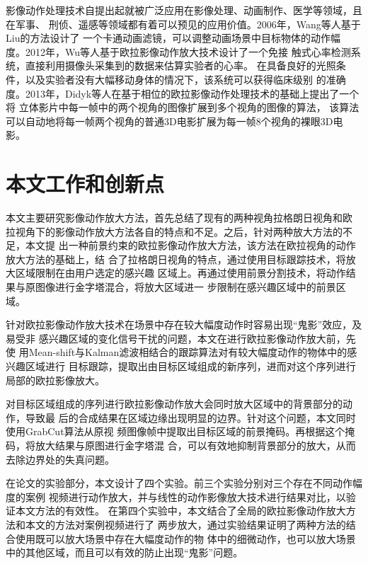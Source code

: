 影像动作处理技术自提出起就被广泛应用在影像处理、动画制作、医学等领域，且在军事、
刑侦、遥感等领域都有着可以预见的应用价值。2006年，Wang等人基于Liu的方法设计了
一个卡通动画滤镜，可以调整动画场景中目标物体的动作幅
度。2012年，Wu等人基于欧拉影像动作放大技术设计了一个免接
触式心率检测系统，直接利用摄像头采集到的数据来估算实验者的心率。
在具备良好的光照条件，以及实验者没有大幅移动身体的情况下，该系统可以获得临床级别
的准确度。2013年，Didyk等人在基于相位的欧拉影像动作处理技术的基础上提出了一个将
立体影片中每一帧中的两个视角的图像扩展到多个视角的图像的算法，
该算法可以自动地将每一帧两个视角的普通3D电影扩展为每一帧8个视角的裸眼3D电影。

\section{本文工作和创新点}
\label{sec:creation}

本文主要研究影像动作放大方法，首先总结了现有的两种视角\pozhehao 拉格朗日视角和欧
拉视角下的影像动作放大方法各自的特点和不足。之后，针对两种放大方法的不足，本文提
出一种前景约束的欧拉影像动作放大方法，该方法在欧拉视角的动作放大方法的基础上，结
合了拉格朗日视角的特点，通过使用目标跟踪技术，将放大区域限制在由用户选定的感兴趣
区域上。再通过使用前景分割技术，将动作结果与原图像进行金字塔混合，将放大区域进一
步限制在感兴趣区域中的前景区域。

针对欧拉影像动作放大技术在场景中存在较大幅度动作时容易出现“鬼影”效应，及易受非
感兴趣区域的变化信号干扰的问题，本文在进行欧拉影像动作放大前，先使
用Mean-shift与Kalman滤波相结合的跟踪算法对有较大幅度动作的物体中的感兴趣区域进行
目标跟踪，提取出由目标区域组成的新序列，进而对这个序列进行局部的欧拉影像放大。

对目标区域组成的序列进行欧拉影像动作放大会同时放大区域中的背景部分的动作，导致最
后的合成结果在区域边缘出现明显的边界。针对这个问题，本文同时使用GrabCut算法从原视
频图像帧中提取出目标区域的前景掩码。再根据这个掩码，将放大结果与原图进行金字塔混
合，可以有效地抑制背景部分的放大，从而去除边界处的失真问题。

在论文的实验部分，本文设计了四个实验。前三个实验分别对三个存在不同动作幅度的案例
视频进行动作放大，并与线性的动作影像放大技术进行结果对比，以验证本文方法的有效性。
在第四个实验中，本文结合了全局的欧拉影像动作放大方法和本文的方法对案例视频进行了
两步放大，通过实验结果证明了两种方法的结合使用既可以放大场景中存在大幅度动作的物
体中的细微动作，也可以放大场景中的其他区域，而且可以有效的防止出现“鬼影”问题。

